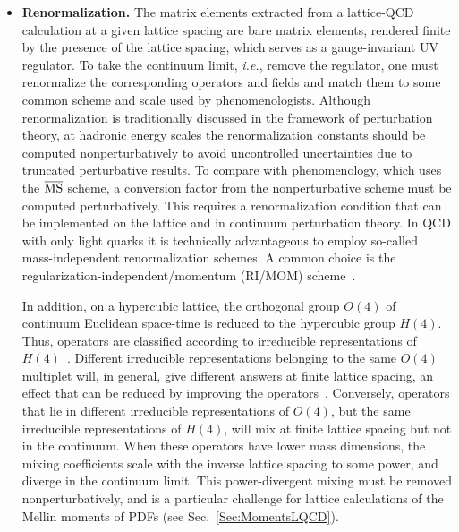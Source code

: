 \begin{itemize}
\item {\bfseries Renormalization.} The matrix elements extracted from a 
lattice-QCD calculation at a given lattice spacing are bare matrix elements,
rendered finite by the presence of the lattice spacing, which serves
as a gauge-invariant UV regulator. 
%
To take the continuum limit, {\it i.e.}, remove the regulator, one must 
renormalize the corresponding operators and fields and match them to some 
common scheme and scale used by phenomenologists. 
%
Although renormalization is traditionally
discussed in the framework of perturbation theory, at hadronic energy
scales the renormalization constants should be computed
nonperturbatively to avoid uncontrolled uncertainties due to 
truncated perturbative results.
%
To compare with phenomenology, which uses the $\overline{\rm MS}$ scheme, 
a conversion factor from the nonperturbative scheme must be computed 
perturbatively. 
%
This requires a renormalization condition that can be implemented on the 
lattice and in continuum perturbation theory. 
%
In QCD with only light quarks it is technically advantageous to employ 
so-called mass-independent renormalization schemes. 
%
A common choice is the regularization-independent/momentum (RI/MOM) 
scheme~\cite{Martinelli:1994ty}.

In addition, on a hypercubic lattice, the orthogonal group $O(4)$ of
continuum Euclidean space-time is reduced to the hypercubic group
$H(4)$.
%
Thus, operators are classified according to irreducible
representations of $H(4)$~\cite{Gockeler:1996mu}.
%
Different irreducible representations belonging to the same $O(4)$ multiplet
will, in general, give different answers at finite lattice spacing, an effect 
that can be reduced by improving the operators~\cite{Gockeler:2004wp}.
%
Conversely, operators that lie in different irreducible representations of 
$O(4)$, but the same irreducible representations of $H(4)$, will mix at finite 
lattice spacing but not in the continuum. 
%
When these operators have lower mass dimensions,
the mixing coefficients scale with the inverse lattice spacing to some
power, and diverge in the continuum limit.
%
This power-divergent mixing
must be removed nonperturbatively, and is a particular challenge for
lattice calculations of the Mellin moments of PDFs (see
Sec.~\ref{Sec:MomentsLQCD}).



\end{itemize}
